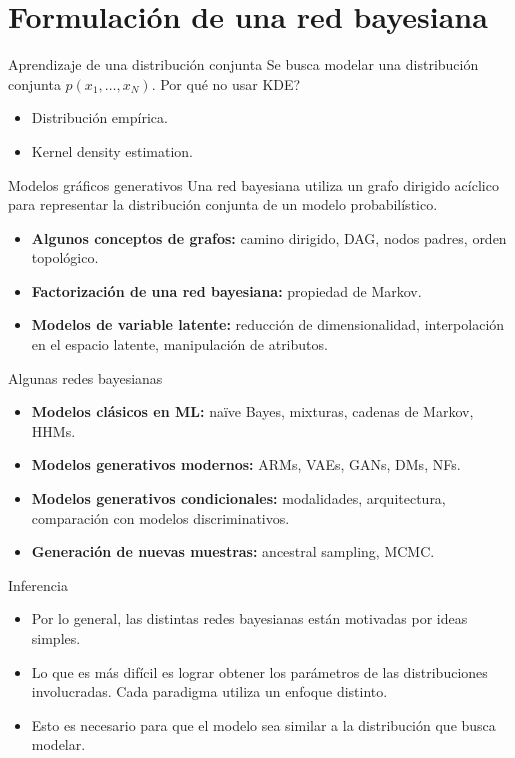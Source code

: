 \documentclass{beamer}
\begin{document}
\section{Formulación de una red bayesiana}

\begin{frame}{Aprendizaje de una distribución conjunta}
    Se busca modelar una distribución conjunta $p(x_1,\ldots,x_N)$. Por qué no usar KDE?
    \begin{itemize}
        \item<2>Distribución empírica.
        \item<3>Kernel density estimation.
    \end{itemize}
\end{frame}

\begin{frame}{Modelos gráficos generativos}
    Una red bayesiana utiliza un grafo dirigido acíclico para representar la distribución conjunta de un modelo probabilístico.
    \begin{itemize}
        \item<2> \textbf{Algunos conceptos de grafos:} camino dirigido, DAG, nodos padres, orden topológico.
        \item<3> \textbf{Factorización de una red bayesiana:} propiedad de Markov.
        \item<4> \textbf{Modelos de variable latente:} reducción de dimensionalidad, interpolación en el espacio latente, manipulación de atributos.
    \end{itemize}
\end{frame}

\begin{frame}{Algunas redes bayesianas}
    \begin{itemize}
        \item<2> \textbf{Modelos clásicos en ML:} naïve Bayes, mixturas, cadenas de Markov, HHMs.
        \item<3> \textbf{Modelos generativos modernos:} ARMs, VAEs, GANs, DMs, NFs.
        \item<4> \textbf{Modelos generativos condicionales:} modalidades, arquitectura, comparación con modelos discriminativos.
        \item<5> \textbf{Generación de nuevas muestras:} ancestral sampling, MCMC.
    \end{itemize}
\end{frame}

\begin{frame}{Inferencia}
    \begin{itemize}
        \item<1> Por lo general, las distintas redes bayesianas están motivadas por ideas simples.
        \item<2> Lo que es más difícil es lograr obtener los parámetros de las distribuciones involucradas. Cada paradigma utiliza un enfoque distinto.
        \item<3> Esto es necesario para que el modelo sea similar a la distribución que busca modelar.
    \end{itemize}
\end{frame}
\end{document}
